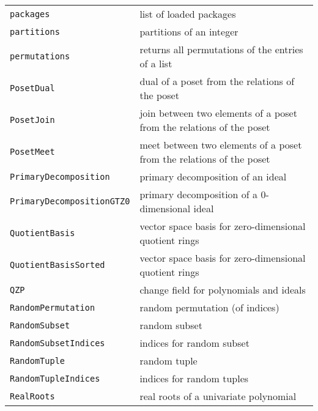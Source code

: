 \documentclass[a4paper]{mybook}
\begin{document}
\begin{center}
\begin{longtable}{ll}
{\verb~packages~} &
      list of loaded packages\\
   
{\verb~partitions~} &
      partitions of an integer\\
   
{\verb~permutations~} &
      returns all permutations of the entries of a list\\
   
{\verb~PosetDual~} &
      dual of a poset from the relations of the poset\\
   
{\verb~PosetJoin~} &
      join between two elements of a poset from the relations of the poset\\
   
{\verb~PosetMeet~} &
      meet between two elements of a poset from the relations of the poset\\
   
{\verb~PrimaryDecomposition~} &
      primary decomposition of an ideal\\
   
{\verb~PrimaryDecompositionGTZ0~} &
      primary decomposition of a 0-dimensional ideal\\
   
{\verb~QuotientBasis~} &
      vector space basis for zero-dimensional quotient rings\\
   
{\verb~QuotientBasisSorted~} &
      vector space basis for zero-dimensional quotient rings\\
   
{\verb~QZP~} &
      change field for polynomials and ideals\\
   
{\verb~RandomPermutation~} &
      random permutation (of indices)\\
   
{\verb~RandomSubset~} &
      random subset\\
   
{\verb~RandomSubsetIndices~} &
      indices for random subset\\
   
{\verb~RandomTuple~} &
      random tuple\\
   
{\verb~RandomTupleIndices~} &
      indices for random tuples\\
   
{\verb~RealRoots~} &
      real roots of a univariate polynomial\\
   

\end{longtable}
\end{center}
\end{document}
